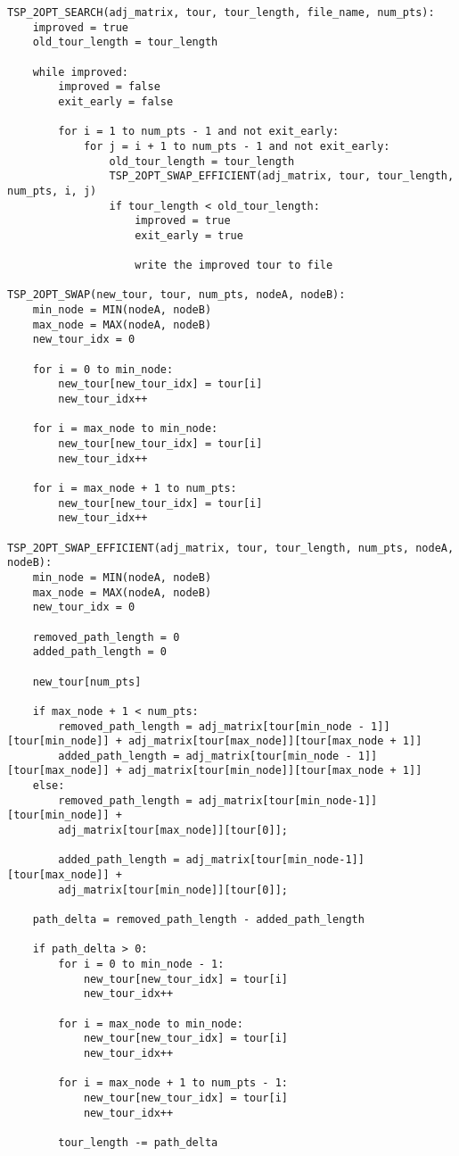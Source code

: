 \documentclass[../report/main.tex]{subfiles}
\begin{document}
\begin{verbatim}
TSP_2OPT_SEARCH(adj_matrix, tour, tour_length, file_name, num_pts):
    improved = true
    old_tour_length = tour_length

    while improved:
        improved = false
        exit_early = false

        for i = 1 to num_pts - 1 and not exit_early:
            for j = i + 1 to num_pts - 1 and not exit_early:
                old_tour_length = tour_length
                TSP_2OPT_SWAP_EFFICIENT(adj_matrix, tour, tour_length, num_pts, i, j)
                if tour_length < old_tour_length:
                    improved = true
                    exit_early = true

                    write the improved tour to file

TSP_2OPT_SWAP(new_tour, tour, num_pts, nodeA, nodeB):
    min_node = MIN(nodeA, nodeB)
    max_node = MAX(nodeA, nodeB)
    new_tour_idx = 0

    for i = 0 to min_node:
        new_tour[new_tour_idx] = tour[i]
        new_tour_idx++

    for i = max_node to min_node:
        new_tour[new_tour_idx] = tour[i]
        new_tour_idx++

    for i = max_node + 1 to num_pts:
        new_tour[new_tour_idx] = tour[i]
        new_tour_idx++

TSP_2OPT_SWAP_EFFICIENT(adj_matrix, tour, tour_length, num_pts, nodeA, nodeB):
    min_node = MIN(nodeA, nodeB)
    max_node = MAX(nodeA, nodeB)
    new_tour_idx = 0

    removed_path_length = 0
    added_path_length = 0

    new_tour[num_pts]

    if max_node + 1 < num_pts:
        removed_path_length = adj_matrix[tour[min_node - 1]][tour[min_node]] + adj_matrix[tour[max_node]][tour[max_node + 1]]
        added_path_length = adj_matrix[tour[min_node - 1]][tour[max_node]] + adj_matrix[tour[min_node]][tour[max_node + 1]]
    else:
        removed_path_length = adj_matrix[tour[min_node-1]][tour[min_node]] + 
        adj_matrix[tour[max_node]][tour[0]];

        added_path_length = adj_matrix[tour[min_node-1]][tour[max_node]] + 
        adj_matrix[tour[min_node]][tour[0]];

    path_delta = removed_path_length - added_path_length

    if path_delta > 0:
        for i = 0 to min_node - 1:
            new_tour[new_tour_idx] = tour[i]
            new_tour_idx++

        for i = max_node to min_node:
            new_tour[new_tour_idx] = tour[i]
            new_tour_idx++

        for i = max_node + 1 to num_pts - 1:
            new_tour[new_tour_idx] = tour[i]
            new_tour_idx++

        tour_length -= path_delta
\end{verbatim}
\end{document}
